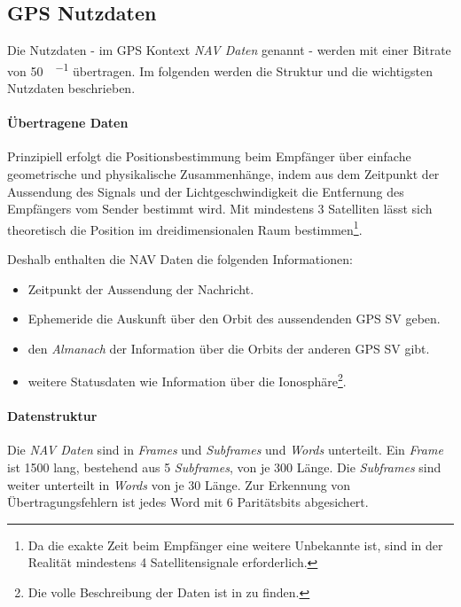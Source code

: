 
\subsection{GPS Nutzdaten}
Die Nutzdaten - im GPS Kontext \emph{NAV Daten} genannt - werden mit einer Bitrate von \SI{50}{\bit\per\sec} übertragen. Im folgenden werden die Struktur und die wichtigsten Nutzdaten beschrieben.

\paragraph{Übertragene Daten}
Prinzipiell erfolgt die Positionsbestimmung beim Empfänger über einfache geometrische und physikalische Zusammenhänge, indem aus dem Zeitpunkt der Aussendung des Signals und der Lichtgeschwindigkeit die Entfernung des Empfängers vom Sender bestimmt wird. Mit mindestens 3 Satelliten lässt sich theoretisch die Position im dreidimensionalen Raum bestimmen\footnote{Da die exakte Zeit beim Empfänger eine weitere Unbekannte ist, sind in der Realität mindestens 4 Satellitensignale erforderlich.}.

Deshalb enthalten die NAV Daten die folgenden Informationen:
\begin{itemize}
\item Zeitpunkt der Aussendung der Nachricht.
\item Ephemeride die Auskunft über den Orbit des aussendenden GPS \gls{SV} geben.
\item den \emph{Almanach} der Information über die Orbits der anderen GPS \gls{SV} gibt.
\item weitere Statusdaten wie Information über die Ionosphäre\footnote{Die volle Beschreibung der Daten ist in \cite{specification2010gps} zu finden.}.
\end{itemize}

\paragraph{Datenstruktur}
Die \emph{NAV Daten} sind in \emph{Frames} und \emph{Subframes} und \emph{Words} unterteilt. Ein \emph{Frame} ist \SI{1500}{\bit} lang, bestehend aus 5 \emph{Subframes}, von je \SI{300}{\bit} Länge. Die \emph{Subframes} sind weiter unterteilt in \emph{Words} von je \SI{30}{\bit} Länge. Zur Erkennung von Übertragungsfehlern ist jedes Word mit 6 Paritätsbits abgesichert. 

